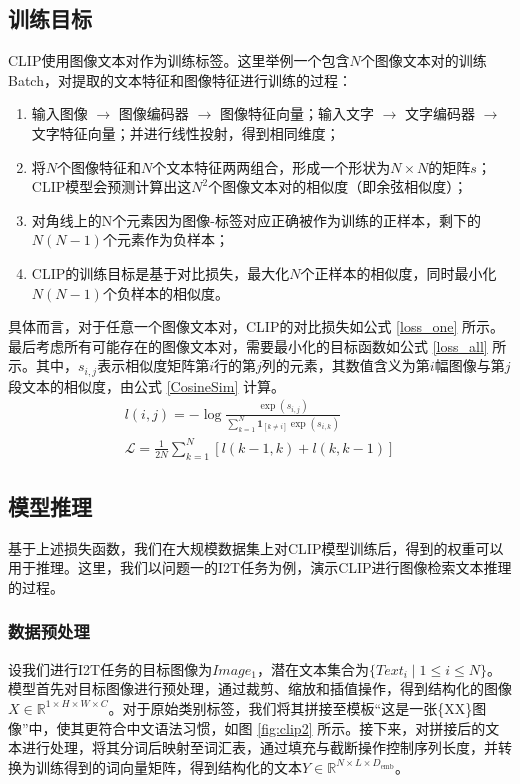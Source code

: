 \documentclass[a4paper]{zreport}
\begin{document}
\subsection{训练目标}

CLIP使用图像文本对作为训练标签。这里举例一个包含$N$个图像文本对的训练Batch，对提取的文本特征和图像特征进行训练的过程：

\begin{enumerate}
\item 输入图像 $\rightarrow$ 图像编码器 $\rightarrow$ 图像特征向量；输入文字 $\rightarrow$ 文字编码器 $\rightarrow$ 文字特征向量；并进行线性投射，得到相同维度；
\item 将$N$个图像特征和$N$个文本特征两两组合，形成一个形状为$N \times N$的矩阵$s$；
CLIP模型会预测计算出这$N^2$个图像文本对的相似度（即余弦相似度）；
\item 对角线上的N个元素因为图像-标签对应正确被作为训练的正样本，剩下的$N(N-1)$个元素作为负样本；
\item CLIP的训练目标是基于对比损失，最大化$N$个正样本的相似度，同时最小化$N(N-1)$个负样本的相似度。
\end{enumerate}

具体而言，对于任意一个图像文本对，CLIP的对比损失如公式 \eqref{loss_one} 所示。最后考虑所有可能存在的图像文本对，需要最小化的目标函数如公式 \eqref{loss_all} 所示。其中，$s_{i,j}$表示相似度矩阵第$i$行的第$j$列的元素，其数值含义为第$i$幅图像与第$j$段文本的相似度，由公式 \eqref{CosineSim} 计算。
\begin{gather}
l(i,j)=-\log\frac{\exp(s_{i,j})}{\sum_{k=1}^{N} \mathbf{1}_{\left[k \ne i\right]} \exp(s_{i,k})}\label{loss_one}\\
\mathcal{L}=\frac{1}{2N}\sum_{k=1}^N[l(k-1,k)+l(k,k-1)]\label{loss_all}
\end{gather}


\subsection{模型推理} \label{infer}

基于上述损失函数，我们在大规模数据集上对CLIP模型训练后，得到的权重可以用于推理。这里，我们以问题一的I2T任务为例，演示CLIP进行图像检索文本推理的过程。

\subsubsection{数据预处理}

设我们进行I2T任务的目标图像为$Image_1$，潜在文本集合为$\{Text_i \mid 1 \le i \le N\}$。模型首先对目标图像进行预处理，通过裁剪、缩放和插值操作，得到结构化的图像 $X \in \mathbb{R}^{1 \times H \times W \times C}$。对于原始类别标签，我们将其拼接至模板“这是一张\{XX\}图像”中，使其更符合中文语法习惯，如图 \ref{fig:clip2} 所示。接下来，对拼接后的文本进行处理，将其分词后映射至词汇表，通过填充与截断操作控制序列长度，并转换为训练得到的词向量矩阵，得到结构化的文本$Y \in \mathbb{R}^{N \times L \times D_\mathrm{emb}}$。
\end{document}
